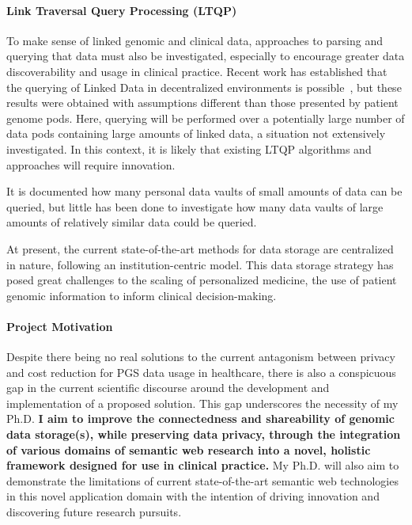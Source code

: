 \documentclass[a4paper,11pt]{article}
\begin{document}
\begin{refsection}
\paragraph{Link Traversal Query Processing (LTQP)} %
To make sense of linked genomic and clinical data, approaches to parsing and querying that data must also be investigated, especially to encourage greater data discoverability and usage in clinical practice.
Recent work has established that the querying of Linked Data in decentralized environments is possible~\cite{taelman_LTQP_2023}, but these results were obtained with assumptions different than those presented by patient genome pods.
Here, querying will be performed over a potentially large number of data pods containing large amounts of linked data, a situation not extensively investigated. In this context, it is likely that existing LTQP algorithms and approaches will require innovation. 

It is documented how many personal data vaults of small amounts of data can be queried, but little has been done to investigate how many data vaults of large amounts of relatively similar data could be queried.

At present, the current state-of-the-art methods for data storage are centralized in nature, following an institution-centric model. 
This data storage strategy has posed great challenges to the scaling of personalized medicine, the use of patient genomic information to inform clinical decision-making.


\paragraph{Project Motivation}
Despite there being no real solutions to the current antagonism between privacy and cost reduction for PGS data usage in healthcare, there is also a conspicuous gap in the current scientific discourse around the development and implementation of a proposed solution. 
This gap underscores the necessity of my Ph.D.
\textbf{I aim to improve the connectedness and shareability of genomic data storage(s), while preserving data privacy, through the 
integration of various domains of semantic web research into a novel, holistic framework designed for use in clinical practice.}
My Ph.D. will also aim to demonstrate the limitations of current state-of-the-art semantic web technologies in this novel application domain with the intention of driving innovation and discovering future research pursuits.




\end{refsection}
\end{document}
